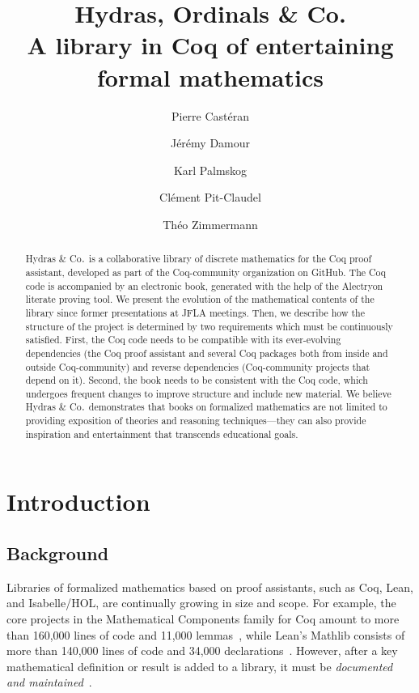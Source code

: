 \documentclass{easychair}
\title{Hydras,  Ordinals \& Co.   \\
  A library in Coq of entertaining formal mathematics}
\author{
Pierre Castéran \inst{1}
\and
    Jérémy Damour \inst{2}
\and
Karl Palmskog \inst{3}
\and Clément Pit-Claudel \inst{4}
\and Théo Zimmermann \inst{5}
}
\institute{
Univ. Bordeaux, CNRS, Bordeaux INP, LaBRI, UMR 5800, F-33400 Talence, France  %
\and
Univ. de Paris, F-75013 Paris, France
\and
KTH Royal Institute of Technology, Stockholm, Sweden
\and
MIT CSAIL, Cambridge, Massachusetts, USA
\and
Inria, Univ. de Paris, CNRS, IRIF, UMR 8243, F-75013 Paris, France
}
\newcommand{\coq}{Coq\xspace}
\newcommand{\community}{Coq-community\xspace}
\newcommand{\alectr}{Alectryon\xspace}
\newcommand{\Hydras}{Hydras \& Co$\text.$\xspace}
\begin{document}
\maketitle


\begin{abstract}
  \Hydras is a collaborative library of discrete mathematics for the
  \coq proof assistant, developed as part of the \community organization
  on GitHub. The Coq code is accompanied
  by an electronic book, generated with the help of the \alectr
  literate proving tool. We present the evolution of the mathematical
  contents of the library since former presentations at JFLA meetings.
  Then, we describe how the structure of the project is determined
  by two requirements which must be continuously satisfied.
  First, the Coq code needs to be compatible with its ever-evolving
  dependencies (the Coq proof assistant and several Coq packages both from
  inside and outside \community) and reverse dependencies (\community
  projects that depend on it). Second, the book needs to be consistent
  with the Coq code, which undergoes frequent changes to improve
  structure and include new material. We believe \Hydras demonstrates
  that books on formalized mathematics are not limited to
  providing exposition of theories and reasoning techniques---they
  can also provide inspiration and entertainment that transcends educational goals.
\end{abstract}




\section{Introduction}
\label{sect:introduction}

\subsection{Background}

Libraries of formalized mathematics based on proof assistants, such as \coq, Lean, and Isabelle/HOL, are continually growing in size and scope.
For example, the core projects in the Mathematical Components family for Coq amount to more than 160,000 lines of code and 11,000 lemmas~\cite{Nie2020a}, while Lean's Mathlib consists of more than 140,000 lines of code and 34,000 declarations~\cite{Mathlib}. However, after a key mathematical definition or result is added to a library, it must be \emph{documented and maintained}~\cite{vanDoorn2020,alectryonpaper}.
\end{document}
